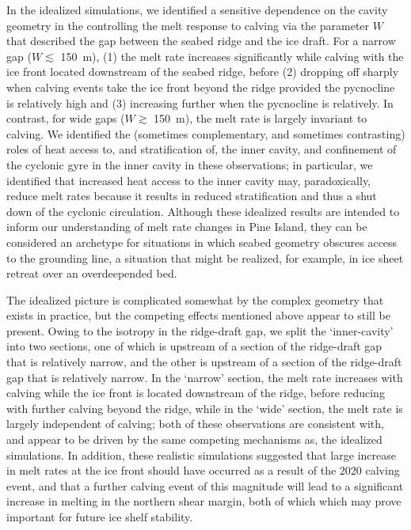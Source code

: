 \documentclass[draft]{agujournal2019}
\begin{document}
In the idealized simulations, we identified a sensitive dependence on the cavity geometry in the controlling the melt response to calving via the parameter $W$ that described the gap between the seabed ridge and the ice draft. For a narrow gap ($W \lesssim$ 150~m), (1) the melt rate increases significantly while calving with the ice front located downstream of the seabed ridge, before (2) dropping off sharply when calving events take the ice front beyond the ridge provided the pycnocline is relatively high and (3) increasing further when the pycnocline is relatively. In contrast, for wide gaps ($W \gtrsim$ 150~m), the melt rate is largely invariant to calving. We identified the (sometimes complementary, and sometimes contrasting) roles of heat access to, and stratification of, the inner cavity, and confinement of the cyclonic gyre in the inner cavity in these observations; in particular, we identified that increased heat access to the inner cavity may, paradoxically, reduce melt rates because it results in reduced stratification and thus a shut down of the cyclonic circulation. Although these idealized results are intended to inform our understanding of melt rate changes in Pine Island, they can be considered an archetype for situations in which seabed geometry obscures access to the grounding line, a situation that might be realized, for example, in ice sheet retreat over an overdeepended bed. 

The idealized picture is complicated somewhat by the complex geometry that exists in practice, but the competing effects mentioned above appear to still be present. Owing to the isotropy in the ridge-draft gap, we split the `inner-cavity' into two sections, one of which is upstream of a section of the ridge-draft gap that is relatively narrow, and the other is upstream of a section of the ridge-draft gap that is relatively narrow. In the `narrow' section, the melt rate increases with calving while the ice front is located downstream of the ridge, before reducing with further calving beyond the ridge, while in the `wide' section, the melt rate is largely independent of calving; both of these observations are consistent with, and appear to be driven by the same competing mechanisms as, the idealized simulations. In addition, these realistic simulations suggested that large increase in melt rates at the ice front should have occurred as a result of the 2020 calving event, and that a further calving event of this magnitude will lead to a significant increase in melting in the northern shear margin, both of which which may prove important for future ice shelf stability.
\end{document}
